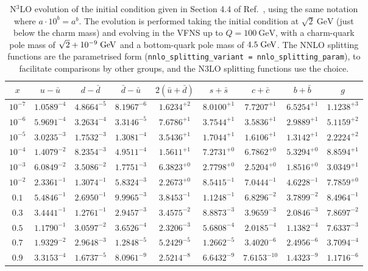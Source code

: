 \begin{table}[ht!]
  \small \centering
  \begin{tabular}{c|cccccccc}
    $x$ &  $u-\bar u$ &$d-\bar d$ &$\bar d-\bar u$ &  $ 2(\bar u+\bar d)$  &$s+\bar s$&$c+\bar c$ &$b+\bar b$  &   $g$\\
    \toprule
$10^{-7}$ &  $1.0589^{-4}$ &  $4.8664^{-5}$ &  $8.1967^{-6}$ &  $1.6234^{+2}$ &  $8.0100^{+1}$ &  $7.7207^{+1}$ &  $6.5254^{+1}$ &  $1.1238^{+3}$ \\
$10^{-6}$ &  $5.9691^{-4}$ &  $3.2634^{-4}$ &  $3.3146^{-5}$ &  $7.6786^{+1}$ &  $3.7544^{+1}$ &  $3.5836^{+1}$ &  $2.9889^{+1}$ &  $5.1159^{+2}$ \\
$10^{-5}$ &  $3.0235^{-3}$ &  $1.7532^{-3}$ &  $1.3081^{-4}$ &  $3.5436^{+1}$ &  $1.7044^{+1}$ &  $1.6106^{+1}$ &  $1.3142^{+1}$ &  $2.2224^{+2}$ \\
$10^{-4}$ &  $1.4079^{-2}$ &  $8.2354^{-3}$ &  $4.9511^{-4}$ &  $1.5611^{+1}$ &  $7.2731^{+0}$ &  $6.7862^{+0}$ &  $5.3294^{+0}$ &  $8.8594^{+1}$ \\
$10^{-3}$ &  $6.0849^{-2}$ &  $3.5086^{-2}$ &  $1.7751^{-3}$ &  $6.3823^{+0}$ &  $2.7798^{+0}$ &  $2.5204^{+0}$ &  $1.8516^{+0}$ &  $3.0349^{+1}$ \\
$10^{-2}$ &  $2.3361^{-1}$ &  $1.3074^{-1}$ &  $5.8324^{-3}$ &  $2.2673^{+0}$ &  $8.5415^{-1}$ &  $7.0444^{-1}$ &  $4.6228^{-1}$ &  $7.7859^{+0}$ \\
$0.1$    &  $5.4846^{-1}$ &  $2.6950^{-1}$ &  $9.9965^{-3}$ &  $3.8453^{-1}$ &  $1.1248^{-1}$ &  $6.8296^{-2}$ &  $3.7899^{-2}$ &  $8.4964^{-1}$ \\
$0.3$    &  $3.4441^{-1}$ &  $1.2761^{-1}$ &  $2.9457^{-3}$ &  $3.4575^{-2}$ &  $8.8873^{-3}$ &  $3.9659^{-3}$ &  $2.0846^{-3}$ &  $7.8697^{-2}$ \\
$0.5$    &  $1.1790^{-1}$ &  $3.0597^{-2}$ &  $3.6526^{-4}$ &  $2.3206^{-3}$ &  $5.6808^{-4}$ &  $2.0185^{-4}$ &  $1.1382^{-4}$ &  $7.6337^{-3}$ \\
$0.7$    &  $1.9329^{-2}$ &  $2.9648^{-3}$ &  $1.2848^{-5}$ &  $5.2429^{-5}$ &  $1.2662^{-5}$ &  $3.4020^{-6}$ &  $2.4956^{-6}$ &  $3.7094^{-4}$ \\
$0.9$    &  $3.3153^{-4}$ &  $1.6737^{-5}$ &  $8.0961^{-9}$ &  $2.5214^{-8}$ &  $6.6432^{-9}$ &  $7.6153^{-10}$ &  $1.4323^{-9}$ &  $1.1716^{-6}$ 
  \end{tabular}
  \caption{N$^3$LO evolution of the initial condition given in Section
    4.4 of Ref.~\cite{Dittmar:2005ed}, using the same notation where
    $a\cdot10^{b} = a^b$. The evolution is performed taking the
    initial condition at $\sqrt{2}~\text{GeV}$ (just below the charm
    mass) and evolving in the VFNS up to $Q=100~\text{GeV}$, with a
    charm-quark pole mass of $\sqrt{2}+10^{-9}\;\mathrm{GeV}$ and a bottom-quark
    pole mass of $4.5\;\mathrm{GeV}$.
    The NNLO splitting functions are the parametrised form
    (\texttt{nnlo\_splitting\_variant = nnlo\_splitting\_param}), to 
    facilitate comparisons by other groups, and the N3LO splitting
    functions use the
     choice.}
  \label{tab:n3lo-evolve}
\end{table}

